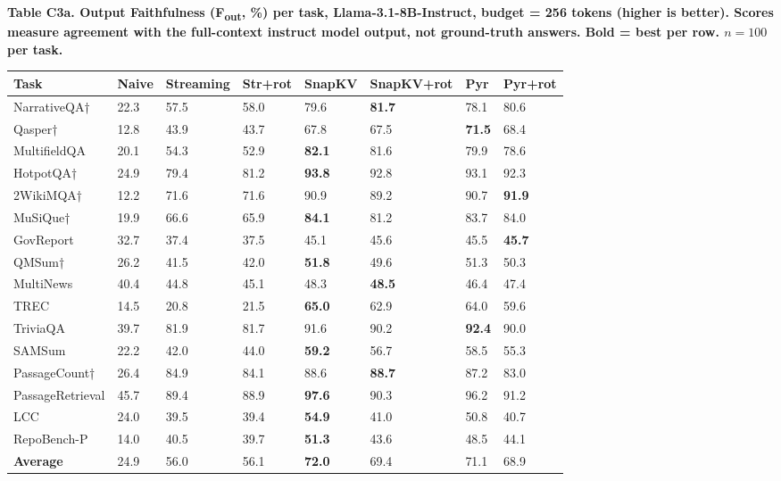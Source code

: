 \documentclass[10pt,letterpaper]{article}
\begin{document}
\textbf{Table C3a. Output Faithfulness (F\textsubscript{out}, \%) per task, Llama-3.1-8B-Instruct,
budget = 256 tokens (higher is better). Scores measure agreement with the full-context
instruct model output, not ground-truth answers. Bold = best per row.
$n = 100$ per task.}

\begin{table}[H]
\centering
\small
\begin{tabular}{@{}llllllll@{}}
\toprule
Task & Naive & Streaming & Str+rot & SnapKV & SnapKV+rot & Pyr &
Pyr+rot\\
\midrule
NarrativeQA† & 22.3 & 57.5 & 58.0 & 79.6 & \textbf{81.7} & 78.1 &
80.6\\
Qasper† & 12.8 & 43.9 & 43.7 & 67.8 & 67.5 & \textbf{71.5} &
68.4\\
MultifieldQA & 20.1 & 54.3 & 52.9 & \textbf{82.1} & 81.6 & 79.9 &
78.6\\
HotpotQA† & 24.9 & 79.4 & 81.2 & \textbf{93.8} & 92.8 & 93.1 &
92.3\\
2WikiMQA† & 12.2 & 71.6 & 71.6 & 90.9 & 89.2 & 90.7 &
\textbf{91.9}\\
MuSiQue† & 19.9 & 66.6 & 65.9 & \textbf{84.1} & 81.2 & 83.7 &
84.0\\
GovReport & 32.7 & 37.4 & 37.5 & 45.1 & 45.6 & 45.5 &
\textbf{45.7}\\
QMSum† & 26.2 & 41.5 & 42.0 & \textbf{51.8} & 49.6 & 51.3 &
50.3\\
MultiNews & 40.4 & 44.8 & 45.1 & 48.3 & \textbf{48.5} & 46.4 &
47.4\\
TREC & 14.5 & 20.8 & 21.5 & \textbf{65.0} & 62.9 & 64.0 &
59.6\\
TriviaQA & 39.7 & 81.9 & 81.7 & 91.6 & 90.2 & \textbf{92.4} &
90.0\\
SAMSum & 22.2 & 42.0 & 44.0 & \textbf{59.2} & 56.7 & 58.5 &
55.3\\
PassageCount† & 26.4 & 84.9 & 84.1 & 88.6 & \textbf{88.7} & 87.2 &
83.0\\
PassageRetrieval & 45.7 & 89.4 & 88.9 & \textbf{97.6} & 90.3 & 96.2 &
91.2\\
LCC & 24.0 & 39.5 & 39.4 & \textbf{54.9} & 41.0 & 50.8 &
40.7\\
RepoBench-P & 14.0 & 40.5 & 39.7 & \textbf{51.3} & 43.6 & 48.5 &
44.1\\
\textbf{Average} & 24.9 & 56.0 & 56.1 & \textbf{72.0} & 69.4 & 71.1 &
68.9\\
\bottomrule
\end{tabular}
\end{table}
\end{document}
